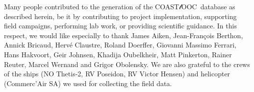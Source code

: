 \documentclass[essd, manuscript]{copernicus}
\newcommand{\coastlooc}{COAST$\mathscr{l}$OOC~\allowbreak}
\begin{document}
\appendixtables   %






\begin{acknowledgements}
    Many people contributed to the generation of the \coastlooc database as described herein, be it by contributing to project implementation, supporting field campaigns, performing lab work, or providing scientific guidance. In this respect, we would like especially to thank James Aiken, Jean-François Berthon, Annick Bricaud, Hervé Claustre, Roland Doerffer, Giovanni Massimo Ferrari, Hans Hakvoort, Geir Johnsen, Khadija Oubelkheir, Matt Pinkerton, Rainer Reuter, Marcel Wernand and Grigor Obolensky. We are also grateful to the crews of the ships (NO Thetis-2, RV Poseidon, RV Victor Hensen) and helicopter (Commerc'Air SA) we used for collecting the field data.
\end{acknowledgements}





\end{document}
